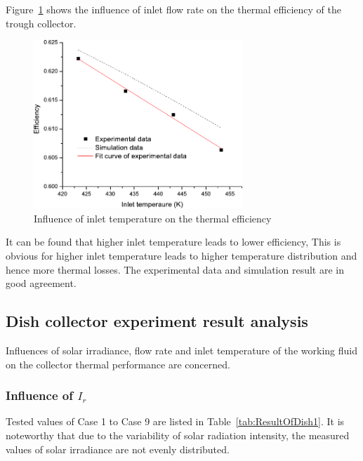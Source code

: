 Figure~\ref{fig:T_i-eta-trough} shows the influence of inlet flow rate on the thermal efficiency of the trough collector.
\begin{figure}[!ht]
\centering
\includegraphics[width=0.7\textwidth]{fig/T_i-eta-trough}
\caption{Influence of inlet temperature on the thermal efficiency}
\label{fig:T_i-eta-trough}
\end{figure}

It can be found that higher inlet temperature leads to lower efficiency, This is obvious for higher inlet temperature leads to higher temperature distribution and hence more thermal losses. The experimental data and simulation result are in good agreement.

\subsection{Dish collector experiment result analysis}
Influences of solar irradiance, flow rate and inlet temperature of the working fluid on the collector thermal performance are concerned.
\subsubsection{Influence of $I_r$}
Tested values of Case 1 to Case 9 are listed in Table~\ref{tab:ResultOfDish1}. It is noteworthy that due to the variability of solar radiation intensity, the measured values of solar irradiance are not evenly distributed.


